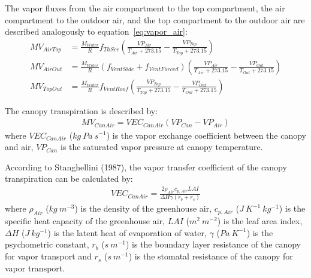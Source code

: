 \documentclass[a4paper]{article}
\numberwithin{equation}{section}
\begin{document}
The vapor fluxes from the air compartment to the top compartment, the air compartment to the outdoor air, and the top compartment to the outdoor air are described analogously to equation~\eqref{eq:vapor_air}:
\begin{align}
  MV_{AirTop} & = \frac{M_{Water}}{R} f_{ThScr} \left(\frac{VP_{Air}}{T_{Air} + 273.15} - \frac{VP_{Top}}{T_{Top} + 273.15}\right)                       \\
  MV_{AirOut} & = \frac{M_{Water}}{R} (f_{VentSide} + f_{VentForced}) \left(\frac{VP_{Air}}{T_{Air} + 273.15} - \frac{VP_{Out}}{T_{Out} + 273.15}\right) \\
  MV_{TopOut} & = \frac{M_{Water}}{R} f_{VentRoof} \left(\frac{VP_{Top}}{T_{Top} + 273.15} - \frac{VP_{Out}}{T_{Out} + 273.15}\right)
\end{align}

The canopy transpiration is described by:
\begin{align}
  MV_{CanAir} = VEC_{CanAir}(VP_{Can} - VP_{Air})
\end{align}
where \( VEC_{CanAir} \) (\( kg\ Pa\ s^{-1} \)) is the vapor exchange coefficient between the canopy and air, \( VP_{Can} \) is the saturated vapor pressure at canopy temperature.

According to Stanghellini (1987), the vapor transfer coefficient of the canopy transpiration can be calculated by:
\begin{align}
  VEC_{CanAir} = \frac{2 \rho_{Air} c_{p,Air}LAI}{\Delta H \gamma (r_b + r_s)}
\end{align}
where \( \rho_{Air} \) (\( kg\ m^{-3} \)) is the density of the greenhouse air, \( c_{p,Air} \) (\( J\ K^{-1}\ kg^{-1} \)) is the specific heat capacity of the greenhouse air, \( LAI \) (\( m^2\ m^{-2} \)) is the leaf area index, \( \Delta H \) (\( J\ kg^{-1} \)) is the latent heat of evaporation of water, \( \gamma \) (\( Pa\ K^{-1} \)) is the psychometric constant, \( r_b \) (\( s\ m^{-1} \)) is the boundary layer resistance of the canopy for vapor transport and \( r_s \) (\( s\ m^{-1} \)) is the stomatal resistance of the canopy for vapor transport.
\end{document}
